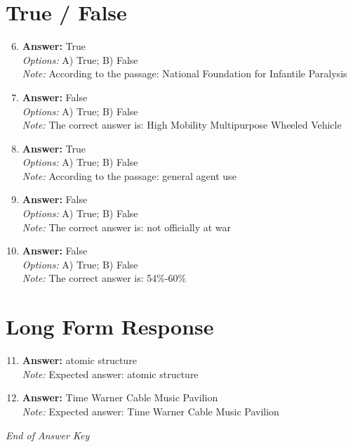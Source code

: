 \documentclass[12pt]{article}
\begin{document}
\section*{True / False}
\begin{enumerate}[label=\arabic*.]
\setcounter{enumi}{5}
\item \textbf{Answer:} True
\\ \textit{Options:} A) True; B) False
\\ \textit{Note:} According to the passage: National Foundation for Infantile Paralysis
\item \textbf{Answer:} False
\\ \textit{Options:} A) True; B) False
\\ \textit{Note:} The correct answer is: High Mobility Multipurpose Wheeled Vehicle
\item \textbf{Answer:} True
\\ \textit{Options:} A) True; B) False
\\ \textit{Note:} According to the passage: general agent use
\item \textbf{Answer:} False
\\ \textit{Options:} A) True; B) False
\\ \textit{Note:} The correct answer is: not officially at war
\item \textbf{Answer:} False
\\ \textit{Options:} A) True; B) False
\\ \textit{Note:} The correct answer is: 54\%-60\%
\end{enumerate}

\section*{Long Form Response}
\begin{enumerate}[label=\arabic*.]
\setcounter{enumi}{10}
\item \textbf{Answer:} atomic structure
\\ \textit{Note:} Expected answer: atomic structure
\item \textbf{Answer:} Time Warner Cable Music Pavilion
\\ \textit{Note:} Expected answer: Time Warner Cable Music Pavilion
\end{enumerate}

\vfill
\noindent\textit{End of Answer Key}
\end{document}
